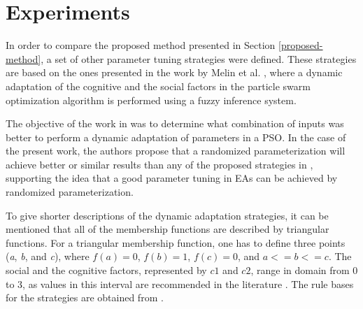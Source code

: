\section{Experiments}
\label{experiments}

In order to compare the proposed method presented in Section \ref{proposed-method}, a set of other parameter tuning strategies were defined. These strategies are based on the ones presented in the work by Melin et al. \cite{melin2013optimal}, where a dynamic adaptation of the cognitive and the social factors in the particle swarm optimization algorithm is performed using a fuzzy inference system.%

The objective of the work in \cite{melin2013optimal} was to determine what combination of inputs was better to perform a dynamic adaptation of parameters in a PSO. In the case of the present work, the authors propose that a randomized parameterization will achieve better or similar results than any of the proposed strategies in \cite{melin2013optimal}, supporting the idea that a good parameter tuning in EAs can be achieved by randomized parameterization.

To give shorter descriptions of the dynamic adaptation strategies, it can be mentioned that all of the membership functions are described by triangular functions. For a triangular membership function, one has to define three points (\textit{a}, \textit{b}, and \textit{c}), where $f(a) = 0$, $f(b) = 1$, $f(c) = 0$, and $a <= b <= c$. The social and the cognitive factors, represented by $c1$ and $c2$, range in domain from 0 to 3, as values in this interval are recommended in the literature \cite{kenndy1995particle}. The rule bases for the strategies are obtained from \cite{melin2013optimal}.

